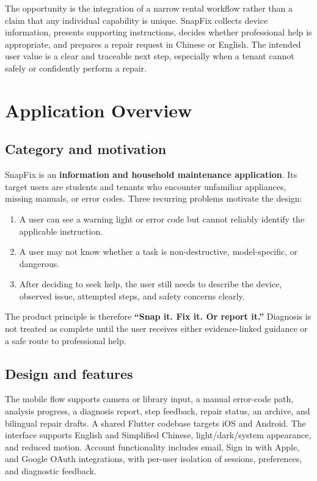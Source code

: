 \documentclass[10.5pt,a4paper]{article}
\begin{document}
The opportunity is the integration of a narrow rental workflow rather than a claim that any individual capability is unique. SnapFix collects device information, presents supporting instructions, decides whether professional help is appropriate, and prepares a repair request in Chinese or English. The intended user value is a clear and traceable next step, especially when a tenant cannot safely or confidently perform a repair.

\section{Application Overview}

\subsection{Category and motivation}

SnapFix is an \textbf{information and household maintenance application}. Its target users are students and tenants who encounter unfamiliar appliances, missing manuals, or error codes. Three recurring problems motivate the design:

\begin{enumerate}
  \item A user can see a warning light or error code but cannot reliably identify the applicable instruction.
  \item A user may not know whether a task is non-destructive, model-specific, or dangerous.
  \item After deciding to seek help, the user still needs to describe the device, observed issue, attempted steps, and safety concerns clearly.
\end{enumerate}

The product principle is therefore \textbf{``Snap it. Fix it. Or report it.''} Diagnosis is not treated as complete until the user receives either evidence-linked guidance or a safe route to professional help.

\subsection{Design and features}

The mobile flow supports camera or library input, a manual error-code path, analysis progress, a diagnosis report, step feedback, repair status, an archive, and bilingual repair drafts. A shared Flutter codebase targets iOS and Android. The interface supports English and Simplified Chinese, light/dark/system appearance, and reduced motion. Account functionality includes email, Sign in with Apple, and Google OAuth integrations, with per-user isolation of sessions, preferences, and diagnostic feedback.
\end{document}
